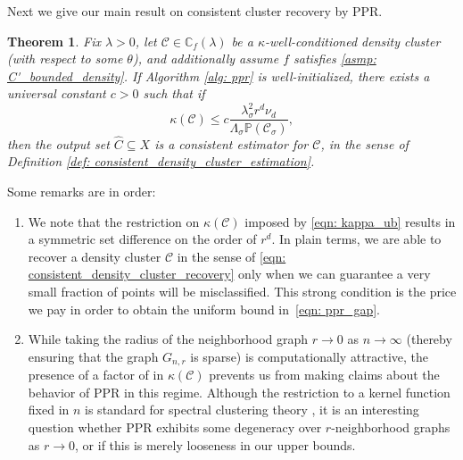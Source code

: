 \documentclass[11pt,twoside]{article}
\newtheorem{theorem}{Theorem}
\newcommand{\1}{\mathbf{1}}
\newcommand{\Xbf}{X}             %
\newcommand{\Pbb}{\mathbb{P}}
\newcommand{\Cbb}{\mathbb{C}}
\newcommand{\Cset}{\mathcal{C}}
\newcommand{\Csig}{\Cset_{\sigma}}
\newcommand{\Cest}{\widehat{C}}
\begin{document}
Next we give our main result on consistent cluster recovery by PPR.

\begin{theorem}
  \label{thm: consistent_recovery_of_density_clusters}
  Fix $\lambda > 0$, let $\Cset \in \Cbb_f(\lambda)$ be a
  $\kappa$-well-conditioned density cluster (with respect to some $\theta$), and
  additionally assume $f$ satisfies \ref{asmp: C'_bounded_density}. If Algorithm
  \ref{alg: ppr} is well-initialized, there exists a universal constant $c >  0$
  such that if  
  \begin{equation}
    \label{eqn: kappa_ub}
    \kappa(\Cset) \leq c \frac{\lambda_{\sigma}^2r^d
      \nu_d}{\Lambda_{\sigma}\Pbb(\Csig)}, 
  \end{equation}
  then the output set $\Cest \subseteq \Xbf$ is a consistent estimator for
  $\Cset$, in the sense of Definition \ref{def: consistent_density_cluster_estimation}. 
\end{theorem}
\noindent Some remarks are in order: 
 \begin{enumerate}  
 \item We note that the restriction on $\kappa(\Cset)$ imposed by \eqref{eqn:
    kappa_ub} results in a symmetric set difference \smash{$\Delta(\Csig[\Xbf],
    \Cest)$} on the order of $r^d$. In plain terms, we are able to recover a
  density cluster $\Cset$ in the sense of \eqref{eqn:
    consistent_density_cluster_recovery} only when we can guarantee a very small
  fraction of points will be misclassified. This strong condition is the price
  we pay in order to obtain the uniform bound in~\eqref{eqn: ppr_gap}. 
 \item While taking the radius of the neighborhood graph $r \to 0$ as $n \to
  \infty$ (thereby ensuring that the graph $G_{n,r}$ is sparse) is computationally
  attractive, the presence of a factor of  in
  $\kappa(\Cset)$ prevents us from making claims about the
  behavior of PPR in this regime. Although the restriction to a kernel
  function fixed in $n$ is standard for spectral clustering theory
  \citep{schiebinger2015,vonluxburg2008}, it is an interesting question whether
  PPR exhibits some degeneracy over $r$-neighborhood graphs as $r \to 0$, or if
  this is merely looseness in our upper bounds.  
\end{enumerate}
\end{document}

